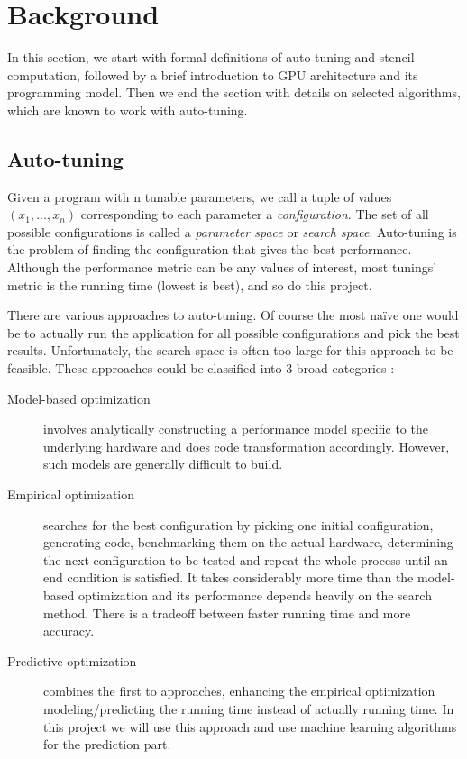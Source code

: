\section{Background}
In this section, we start with formal definitions of auto-tuning and stencil computation, followed by a brief introduction to GPU architecture and its programming model. Then we end the section with details on selected algorithms, which are known to work with auto-tuning.

\subsection{Auto-tuning}
Given a program with n tunable parameters, we call a tuple of values $(x_1, ..., x_n)$ corresponding to each parameter a \emph{configuration}. The set of all possible configurations is called a \emph{parameter space} or \emph{search space}. Auto-tuning  is the problem of finding the configuration that gives the best performance. Although the performance metric can be any values of interest, most tunings' metric is the running time (lowest is best), and so do this project.

There are various approaches to auto-tuning. Of course the most na\"{i}ve one would be to actually run the application for all possible configurations and pick the best results. Unfortunately, the search space is often too large for this approach to be feasible. These approaches could be classified into 3 broad categories \cite{inpar2012}:
\begin{description}
	\item[Model-based optimization] involves analytically constructing a performance model specific to the underlying hardware and does code transformation accordingly. However, such models are generally difficult to build.
	\item[Empirical optimization] searches for the best configuration by picking one initial configuration, generating code, benchmarking them on the actual hardware, determining the next configuration to be tested and repeat the whole process until an end condition is satisfied. It takes considerably more time than the model-based optimization and its performance depends heavily on the search method. There is a tradeoff between faster running time and more accuracy.
	\item[Predictive optimization] combines the first to approaches, enhancing the empirical optimization modeling/predicting the running time instead of actually running time. In this project we will use this approach and use machine learning algorithms for the prediction part.
\end{description}

